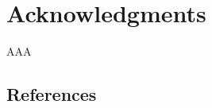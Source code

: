 \documentclass{vldb}
\begin{document}
\section{Acknowledgments}
AAA




\subsection{References}
\end{document}
